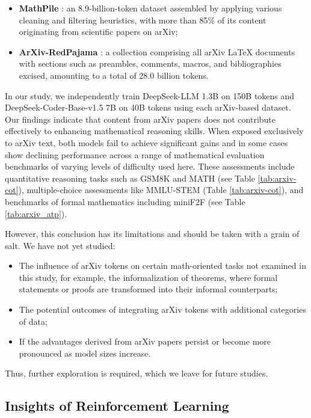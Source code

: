 \begin{itemize}[topsep=0pt]
\begin{itemize}[topsep=0pt]
\begin{itemize}[topsep=0pt]
    \item \textbf{MathPile} \citep{mathpile}: an 8.9-billion-token dataset assembled by applying various cleaning and filtering heuristics, with more than 85\% of its content originating from scientific papers on arXiv;
    \item \textbf{ArXiv-RedPajama} \citep{redpajama}: a collection comprising all arXiv LaTeX documents with sections such as preambles, comments, macros, and bibliographies excised, amounting to a total of 28.0 billion tokens.
\end{itemize}

In our study, we independently train DeepSeek-LLM 1.3B on 150B tokens and DeepSeek-Coder-Base-v1.5 7B on 40B tokens using each arXiv-based dataset. Our findings indicate that content from arXiv papers does not contribute effectively to enhancing mathematical reasoning skills. When exposed exclusively to arXiv text, both models fail to achieve significant gains and in some cases show declining performance across a range of mathematical evaluation benchmarks of varying levels of difficulty used here. These assessments include quantitative reasoning tasks such as GSM8K and MATH (see Table \ref{tab:arxiv-cot}), multiple-choice assessments like MMLU-STEM (Table \ref{tab:arxiv-cot}), and benchmarks of formal mathematics including miniF2F (see Table \ref{tab:arxiv_atp}).

However, this conclusion has its limitations and should be taken with a grain of salt. We have not yet studied:

\begin{itemize}[topsep=0pt]
    \item The influence of arXiv tokens on certain math-oriented tasks not examined in this study, for example, the informalization of theorems, where formal statements or proofs are transformed into their informal counterparts;
    \item The potential outcomes of integrating arXiv tokens with additional categories of data;
    \item If the advantages derived from arXiv papers persist or become more pronounced as model sizes increase.
\end{itemize}

Thus, further exploration is required, which we leave for future studies.

\subsection{Insights of Reinforcement Learning}

\end{itemize}
\end{itemize}
